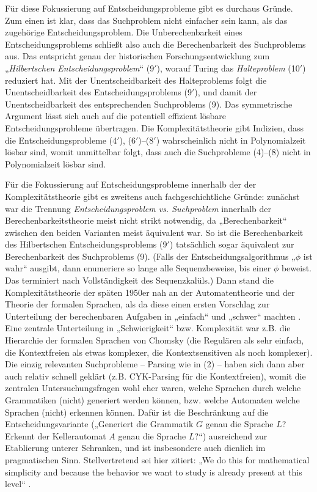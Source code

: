 Für diese Fokussierung auf Entscheidungsprobleme gibt es durchaus Gründe. Zum einen ist klar, dass das Suchproblem nicht einfacher sein kann, als das zugehörige Entscheidungsproblem. Die Unberechenbarkeit eines Entscheidungsproblems schließt also auch die Berechenbarkeit des Suchproblems aus. Das entspricht genau der historischen Forschungsentwicklung zum „\emph{Hilbertschen Entscheidungsproblem}“ (9$'$), worauf Turing das \emph{Halteproblem} (10$'$) reduziert hat. Mit der Unentscheidbarkeit des  Halteproblems folgt die Unentscheidbarkeit des Entscheidungsproblems (9$'$), und damit der Unentscheidbarkeit des entsprechenden Suchproblems (9). 
Das symmetrische Argument lässt sich auch auf die potentiell effizient lösbare Entscheidungsprobleme übertragen. Die Komplexitätstheorie gibt Indizien, dass die Entscheidungsprobleme (4$'$), (6$'$)--(8$'$) wahrscheinlich nicht in Polynomialzeit lösbar sind, womit unmittelbar folgt, dass auch die Suchprobleme (4)--(8) nicht in Polynomialzeit lösbar sind.

Für die Fokussierung auf Entscheidungsprobleme innerhalb der der Komplexitätstheorie gibt es zweitens auch fachgeschichtliche Gründe: zunächst war die Trennung \emph{Entscheidungsproblem vs. Suchproblem} innerhalb der Berechenbarkeitstheorie meist nicht strikt notwendig, da „Berechenbarkeit“ zwischen den beiden Varianten meist äquivalent war. So ist die Berechenbarkeit des Hilbertschen Entscheidungsproblems (9$'$) tatsächlich sogar äquivalent zur Berechenbarkeit des Suchproblems (9). (Falls der Entscheidungsalgorithmus „$\phi$ ist wahr“ ausgibt, dann enumeriere so lange alle Sequenzbeweise, bis einer $\phi$ beweist. Das terminiert nach Vollständigkeit des Sequenzkalüls.)
Dann stand die Komplexitätstheorie der späten 1950er nah an der Automatentheorie und der Theorie der formalen Sprachen, als da diese einen ersten Vorschlag zur Unterteilung 
 der berechenbaren Aufgaben in „einfach“ und „schwer“ machten \parencite[vgl.][]{koucky_automata_2023}. Eine zentrale Unterteilung in „Schwierigkeit“ bzw. Komplexität war z.B. die Hierarchie der formalen Sprachen von Chomsky (die Regulären als sehr einfach, die Kontextfreien als etwas komplexer, die Kontextsensitiven als noch komplexer). %
Die einzig relevanten Suchprobleme -- Parsing wie in (2) -- haben sich dann aber auch relativ schnell geklärt (z.B. CYK-Parsing für die Kontextfreien), womit die zentralen Untersuchungsfragen wohl eher waren, welche Sprachen durch welche Grammatiken (nicht) generiert werden können, bzw. welche Automaten welche Sprachen (nicht) erkennen können. Dafür ist die Beschränkung auf die Entscheidungsvariante („Generiert die Grammatik $G$ genau die Sprache $L$? Erkennt der Kellerautomat $A$ genau die Sprache $L$?“) ausreichend zur Etablierung unterer Schranken, und ist insbesondere auch dienlich im pragmatischen Sinn. Stellvertretend sei hier \citeauthor{kozen_automata_1997} zitiert: „We do this for mathematical simplicity and because the behavior we want to study is already present at this level“ \parencite*[7]{kozen_automata_1997}.

